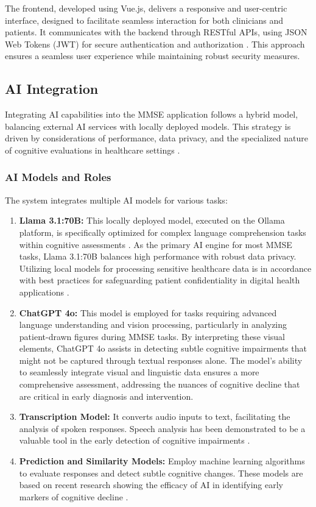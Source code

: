 The frontend, developed using Vue.js, delivers a responsive and user-centric interface, designed to facilitate seamless interaction for both clinicians and patients. It communicates with the backend through RESTful APIs, using JSON Web Tokens (JWT) for secure authentication and authorization \cite{Jones2015}. This approach ensures a seamless user experience while maintaining robust security measures.

\subsection{AI Integration}
Integrating AI capabilities into the MMSE application follows a hybrid model, balancing external AI services with locally deployed models. This strategy is driven by considerations of performance, data privacy, and the specialized nature of cognitive evaluations in healthcare settings \cite{Bauer2012}.

\subsubsection{AI Models and Roles}
The system integrates multiple AI models for various tasks:
\begin{enumerate}
\item \textbf{Llama 3.1:70B:} This locally deployed model, executed on the Ollama platform, is specifically optimized for complex language comprehension tasks within cognitive assessments \cite{Ollama2024}. As the primary AI engine for most MMSE tasks, Llama 3.1:70B balances high performance with robust data privacy. Utilizing local models for processing sensitive healthcare data is in accordance with best practices for safeguarding patient confidentiality in digital health applications \cite{Krutz2017}.
\item \textbf{ChatGPT 4o:} This model is employed for tasks requiring advanced language understanding and vision processing, particularly in analyzing patient-drawn figures during MMSE tasks. By interpreting these visual elements, ChatGPT 4o assists in detecting subtle cognitive impairments that might not be captured through textual responses alone. The model's ability to seamlessly integrate visual and linguistic data ensures a more comprehensive assessment, addressing the nuances of cognitive decline that are critical in early diagnosis and intervention.
\item \textbf{Transcription Model:} It converts audio inputs to text, facilitating the analysis of spoken responses. Speech analysis has been demonstrated to be a valuable tool in the early detection of cognitive impairments \cite{Konig2015}.
\item \textbf{Prediction and Similarity Models:} Employ machine learning algorithms to evaluate responses and detect subtle cognitive changes. These models are based on recent research showing the efficacy of AI in identifying early markers of cognitive decline \cite{Grassi2019}.
\end{enumerate}

